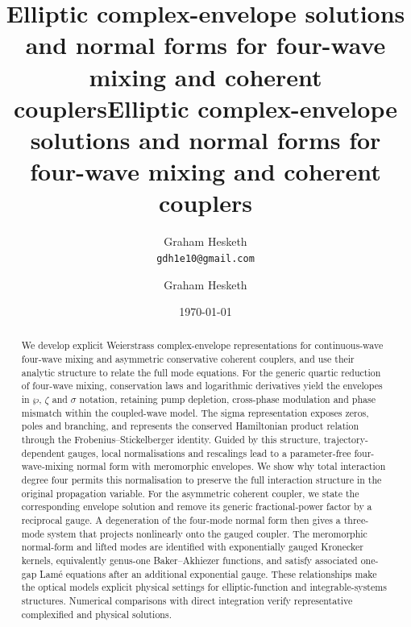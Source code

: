 \documentclass[11pt,a4paper]{article}
\numberwithin{equation}{section}
\begin{document}
\ifpreprint
  \title{Elliptic complex-envelope solutions and normal forms for four-wave mixing and coherent couplers}
  \author{Graham Hesketh \\
  \small \texttt{gdh1e10@gmail.com}}
  \date{\today}
  \maketitle
\else
  \title{Elliptic complex-envelope solutions and normal forms for four-wave mixing and coherent couplers}

  \author{Graham Hesketh}


\fi


\begin{abstract}
We develop explicit Weierstrass complex-envelope representations for continuous-wave four-wave mixing and asymmetric conservative coherent couplers, and use their analytic structure to relate the full mode equations.
For the generic quartic reduction of four-wave mixing, conservation laws and logarithmic derivatives yield the envelopes in $\wp$, $\zeta$ and $\sigma$ notation, retaining pump depletion, cross-phase modulation and phase mismatch within the coupled-wave model.
The sigma representation exposes zeros, poles and branching, and represents the conserved Hamiltonian product relation through the Frobenius--Stickelberger identity.
Guided by this structure, trajectory-dependent gauges, local normalisations and rescalings lead to a parameter-free four-wave-mixing normal form with meromorphic envelopes.
We show why total interaction degree four permits this normalisation to preserve the full interaction structure in the original propagation variable.
For the asymmetric coherent coupler, we state the corresponding envelope solution and remove its generic fractional-power factor by a reciprocal gauge.
A degeneration of the four-mode normal form then gives a three-mode system that projects nonlinearly onto the gauged coupler.
The meromorphic normal-form and lifted modes are identified with exponentially gauged Kronecker kernels, equivalently genus-one Baker--Akhiezer functions, and satisfy associated one-gap Lam\'e equations after an additional exponential gauge.
These relationships make the optical models explicit physical settings for elliptic-function and integrable-systems structures.
Numerical comparisons with direct integration verify representative complexified and physical solutions.
\end{abstract}
\end{document}
